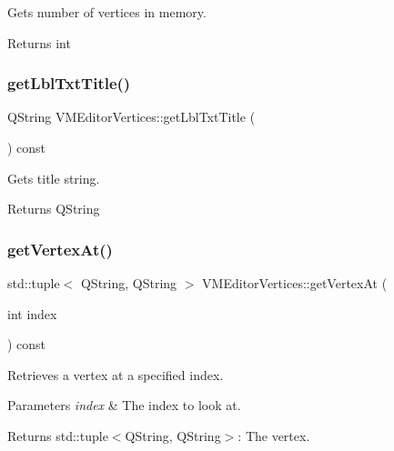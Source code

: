 Gets number of vertices in memory. 

\begin{DoxyReturn}{Returns}
int 
\end{DoxyReturn}
\mbox{\label{class_v_m_editor_vertices_acd45db915cce57f22aef0fa5869c78b8}} 
\subsubsection{\texorpdfstring{getLblTxtTitle()}{getLblTxtTitle()}}
{\footnotesize\ttfamily Q\+String V\+M\+Editor\+Vertices\+::get\+Lbl\+Txt\+Title (\begin{DoxyParamCaption}{ }\end{DoxyParamCaption}) const}



Gets title string. 

\begin{DoxyReturn}{Returns}
Q\+String 
\end{DoxyReturn}
\mbox{\label{class_v_m_editor_vertices_a1fce7e9467a432c63700f889ab8d6d59}} 
\subsubsection{\texorpdfstring{getVertexAt()}{getVertexAt()}}
{\footnotesize\ttfamily std\+::tuple$<$ Q\+String, Q\+String $>$ V\+M\+Editor\+Vertices\+::get\+Vertex\+At (\begin{DoxyParamCaption}\item[{int}]{index }\end{DoxyParamCaption}) const}



Retrieves a vertex at a specified index. 


\begin{DoxyParams}{Parameters}
{\em index} & The index to look at. \\
\hline
\end{DoxyParams}
\begin{DoxyReturn}{Returns}
std\+::tuple$<$\+Q\+String, Q\+String$>$\+: The vertex. 
\end{DoxyReturn}
\mbox{\label{class_v_m_editor_vertices_a3629c7c6ec4cdc153bc12bed2f1504e8}} 
